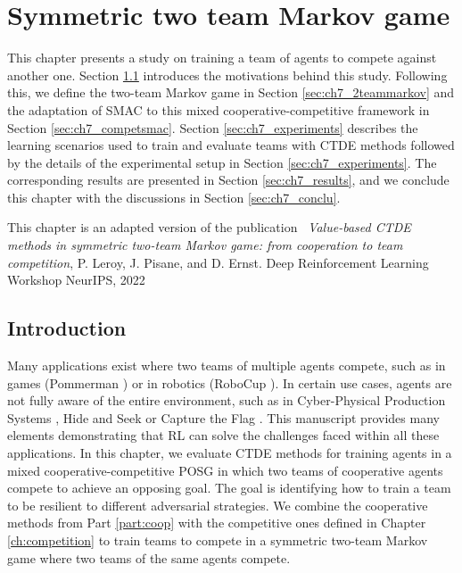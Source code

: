\chapter{Symmetric two team Markov game}\label{ch:2teams}
\begin{chapter_outline}

This chapter presents a study on training a team of agents to compete against another one.
Section \ref{sec:ch7_intro} introduces the motivations behind this study.
Following this, we define the two-team Markov game in Section \ref{sec:ch7_2teammarkov} and the adaptation of SMAC to this mixed cooperative-competitive framework in Section \ref{sec:ch7_competsmac}.
Section \ref{sec:ch7_experiments} describes the learning scenarios used to train and evaluate teams with CTDE methods followed by the details of the experimental setup in Section \ref{sec:ch7_experiments}.
The corresponding results are presented in Section \ref{sec:ch7_results}, and we conclude this chapter with the discussions in Section \ref{sec:ch7_conclu}.

This chapter is an adapted version of the publication~\citep{leroy2022twoteam} \textit{Value-based CTDE methods in symmetric two-team Markov game: from cooperation to team competition}, P. Leroy, J. Pisane, and D. Ernst. Deep Reinforcement Learning Workshop NeurIPS, 2022

\end{chapter_outline}

\section{Introduction} \label{sec:ch7_intro}

Many applications exist where two teams of multiple agents compete, such as in games (Pommerman \citep{resnick2018pommerman}) or in robotics (RoboCup \citep{kitano1997robocup}).
In certain use cases, agents are not fully aware of the entire environment, such as in Cyber-Physical Production Systems \citep{phan2020learning}, Hide and Seek \citep{baker2019emergent} or Capture the Flag \citep{jaderberg2019human}.
This manuscript provides many elements demonstrating that RL can solve the challenges faced within all these applications.
In this chapter, we evaluate CTDE methods for training agents in a mixed cooperative-competitive POSG in which two teams of cooperative agents compete to achieve an opposing goal. 
The goal is identifying how to train a team to be resilient to different adversarial strategies.
We combine the cooperative methods from Part \ref{part:coop} with the competitive ones defined in Chapter \ref{ch:competition} to train teams to compete in a symmetric two-team Markov game where two teams of the same agents compete.

